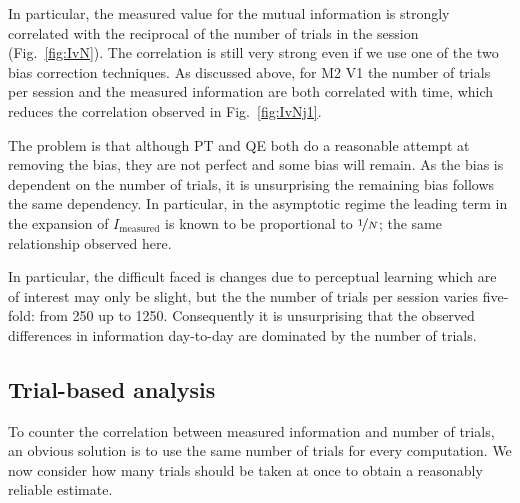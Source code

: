 In particular, the measured value for the mutual information is strongly correlated with the reciprocal of the number of trials in the session (Fig.~\ref{fig:IvN}). The correlation is still very strong even if we use one of the two bias correction techniques. As discussed above, for M2 V1 the number of trials per session and the measured information  are both correlated with time, which reduces the correlation observed in Fig.~\ref{fig:IvNj1}.

The problem is that although PT and QE both do a reasonable attempt at removing the bias, they are not perfect and some bias will remain. As the bias is dependent on the number of trials, it is unsurprising the remaining bias follows the same dependency.
In particular, in the asymptotic regime the leading term in the expansion of $I_{\text{measured}}$ is known to be proportional \cite{Treves1995} to $\nicefrac{1}{N}$; the same relationship observed here.

In particular, the difficult faced is changes due to perceptual learning which are of interest may only be slight, but the the number of trials per session varies five-fold: from 250 up to 1250. Consequently it is unsurprising that the observed differences in information day-to-day are dominated by the number of trials.

% 

\FloatBarrier
\subsection{Trial-based analysis}

To counter the correlation between measured information and number of trials, an obvious solution is to use the same number of trials for every computation. We now consider how many trials should be taken at once to obtain a reasonably reliable estimate.

